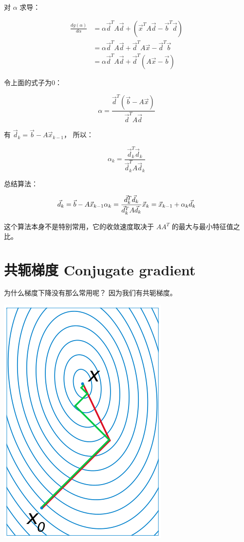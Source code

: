 \documentclass[
]{book}
\begin{document}
对 \(\alpha\) 求导：

\[
\begin{aligned}
\frac{d g(\alpha)}{d \alpha} &= \alpha \vec{d}^T A \vec{d} + (\vec{x}^TA\vec{d} - \vec{b}^T\vec{d}) \\
&= \alpha \vec{d}^T A \vec{d} + \vec{d}^T A\vec{x} - \vec{d}^T \vec{b} \\
&= \alpha \vec{d}^T A \vec{d} + \vec{d}^T (A\vec{x} - \vec{b})
\end{aligned}
\]

令上面的式子为0：

\[
\alpha =  \frac{\vec{d}^T (\vec{b} - A\vec{x} ) } {\vec{d}^TA\vec{d}}
\]

有 \(\vec{d}_k = \vec{b} - A \vec{x}_{k-1}\)， 所以：

\[
\alpha_k =  \frac{\vec{d}_k^T \vec{d}_k } {\vec{d}^T_kA\vec{d}_k}
\]

总结算法：

\[
\vec{d}_k = \vec{b} - A \vec{x}_{k-1} \\
\alpha_k =  \frac{\vec{d}_k^T \vec{d}_k } {\vec{d}^T_kA\vec{d}_k} \\
\vec{x}_k = \vec{x}_{k-1} + \alpha_k \vec{d}_k
\]

这个算法本身不是特别常用，它的收敛速度取决于 \(AA^T\) 的最大与最小特征值之比。

\hypertarget{ux5171ux8f6dux68afux5ea6-conjugate-gradient}{%
\section{共轭梯度 Conjugate gradient}\label{ux5171ux8f6dux68afux5ea6-conjugate-gradient}}

为什么梯度下降没有那么常用呢？ 因为我们有共轭梯度。

\includegraphics{images/323px-Conjugate_gradient_illustration.png}
\end{document}
